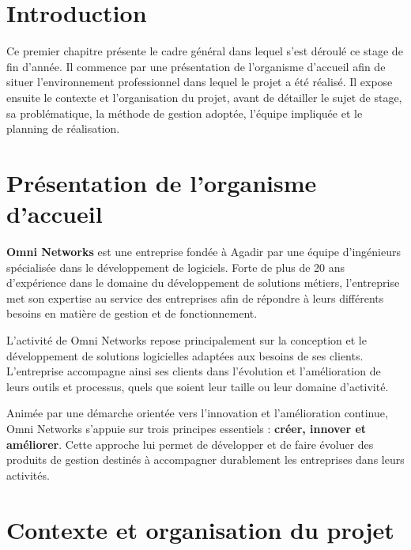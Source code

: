 
\section{Introduction}

Ce premier chapitre présente le cadre général dans lequel s'est déroulé ce stage de fin d'année. Il commence par une présentation de l'organisme d'accueil afin de situer l'environnement professionnel dans lequel le projet a été réalisé. Il expose ensuite le contexte et l'organisation du projet, avant de détailler le sujet de stage, sa problématique, la méthode de gestion adoptée, l'équipe impliquée et le planning de réalisation.

\section{Présentation de l'organisme d'accueil}

\textbf{Omni Networks} est une entreprise fondée à Agadir par une équipe d'ingénieurs spécialisée dans le développement de logiciels. Forte de plus de 20 ans d'expérience dans le domaine du développement de solutions métiers, l'entreprise met son expertise au service des entreprises afin de répondre à leurs différents besoins en matière de gestion et de fonctionnement.

L'activité de Omni Networks repose principalement sur la conception et le développement de solutions logicielles adaptées aux besoins de ses clients. L'entreprise accompagne ainsi ses clients dans l'évolution et l'amélioration de leurs outils et processus, quels que soient leur taille ou leur domaine d'activité.

Animée par une démarche orientée vers l'innovation et l'amélioration continue, Omni Networks s'appuie sur trois principes essentiels : \textbf{créer, innover et améliorer}. Cette approche lui permet de développer et de faire évoluer des produits de gestion destinés à accompagner durablement les entreprises dans leurs activités.

\section{Contexte et organisation du projet}

